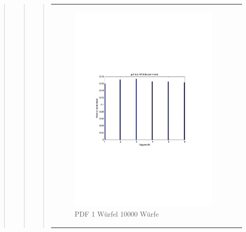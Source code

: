 \begin{quote}
\begin{quote}
\begin{quote}
\begin{center}
\begin{tabular}{ll}
            \hspace{-14em}
                \begin{minipage}{0.6\textwidth}

                    \begin{figure}[H]
                        \label{fig:}
                        \includegraphics[scale=0.6, trim = 3cm 8.5cm 3.5cm 8.5cm, clip]{./Bilder/1wuerfelpdf} %
                        \caption{PDF 1 Würfel 10000 Würfe}
                    \end{figure}

                \end{minipage}
                \begin{minipage}{0.6\textwidth}


\end{minipage}
\end{tabular}
\end{center}
\end{quote}
\end{quote}
\end{quote}

